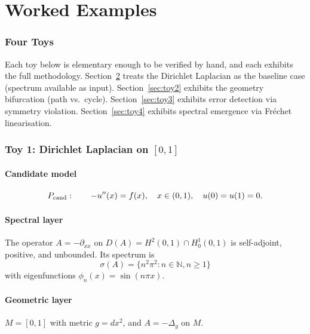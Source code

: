 \documentclass[11pt,a4paper]{article}
\theoremstyle{definition}
\theoremstyle{plain}
\newcommand{\spec}{\sigma}
\newcommand{\N}{\mathbb{N}}
\begin{document}
\part{Worked Examples}

\section{Four Toys}
\label{sec:toys}

Each toy below is elementary enough to be verified by hand, and each
exhibits the full methodology. Section~\ref{sec:toy1} treats the
Dirichlet Laplacian as the baseline case (spectrum available as
input). Section~\ref{sec:toy2} exhibits the geometry bifurcation
(path vs.\ cycle). Section~\ref{sec:toy3} exhibits error detection
via symmetry violation. Section~\ref{sec:toy4} exhibits spectral
emergence via Fr\'echet linearisation.

\section{Toy 1: Dirichlet Laplacian on $[0,1]$}
\label{sec:toy1}

\subsection{Candidate model}

\[
  P_{\rm cand}: \qquad -u''(x) = f(x), \quad x \in (0,1),
  \quad u(0) = u(1) = 0.
\]

\subsection{Spectral layer}

The operator $A = -\partial_{xx}$ on
$D(A) = H^2(0,1) \cap H_0^1(0,1)$ is self-adjoint, positive, and
unbounded. Its spectrum is
\[
  \spec(A) = \{n^2 \pi^2 : n \in \N, n \geq 1\}
\]
with eigenfunctions $\phi_n(x) = \sin(n \pi x)$.

\subsection{Geometric layer}

$M = [0,1]$ with metric $g = dx^2$, and $A = -\Delta_g$ on $M$.
\end{document}
